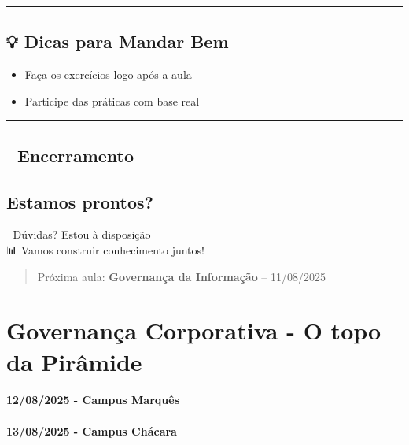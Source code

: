 \documentclass[
]{book}
\providecommand{\tightlist}{%
  \setlength{\itemsep}{0pt}\setlength{\parskip}{0pt}}
\begin{document}
\begin{center}\rule{0.5\linewidth}{0.5pt}\end{center}

\section{💡 Dicas para Mandar Bem}\label{dicas-para-mandar-bem}

\begin{itemize}
\tightlist
\item
  Faça os exercícios logo após a aula
\item
  Participe das práticas com base real
\end{itemize}

\begin{center}\rule{0.5\linewidth}{0.5pt}\end{center}

\section{🙌 Encerramento}\label{encerramento}

\section{Estamos prontos?}\label{estamos-prontos}

📧 Dúvidas? Estou à disposição\\
📊 Vamos construir conhecimento juntos!

\begin{quote}
Próxima aula: \textbf{Governança da Informação} -- 11/08/2025
\end{quote}

\chapter{Governança Corporativa - O topo da Pirâmide}\label{governanuxe7a-corporativa---o-topo-da-piruxe2mide}

\subsubsection*{12/08/2025 - Campus Marquês}\label{campus-marquuxeas-1}

\subsubsection*{13/08/2025 - Campus Chácara}\label{campus-chuxe1cara-1}
\end{document}
